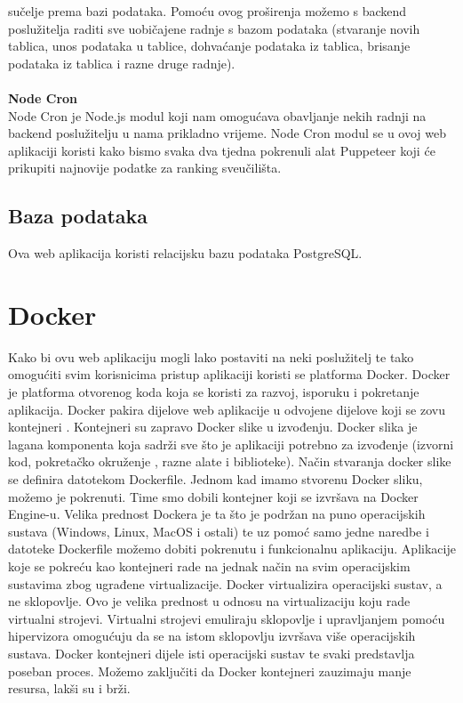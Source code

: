 \documentclass[times, utf8, zavrsni]{fer}
\begin{document}
sučelje prema bazi podataka. Pomoću ovog proširenja možemo s backend poslužitelja raditi sve uobičajene radnje s bazom podataka (stvaranje novih tablica, 
unos podataka u tablice, dohvaćanje podataka iz tablica, brisanje podataka iz tablica i razne druge radnje).
\\ \\ \textbf{Node Cron}
\\ Node Cron je Node.js modul koji nam omogućava obavljanje nekih radnji na backend poslužitelju u nama prikladno vrijeme. Node Cron modul se u ovoj 
web aplikaciji koristi kako bismo svaka dva tjedna pokrenuli alat Puppeteer koji će prikupiti najnovije podatke za ranking sveučilišta.
\\ \subsection{Baza podataka}Ova web aplikacija koristi relacijsku bazu podataka PostgreSQL. 
\\ \section{Docker}
Kako bi ovu web aplikaciju mogli lako postaviti  na neki poslužitelj te tako omogućiti svim korisnicima pristup aplikaciji 
koristi se platforma Docker. Docker je platforma otvorenog koda koja se koristi za razvoj, isporuku i pokretanje aplikacija.
Docker pakira dijelove web aplikacije u odvojene dijelove koji se zovu kontejneri .
Kontejneri su zapravo Docker slike  u izvođenju. Docker slika je lagana  komponenta koja sadrži sve što je aplikaciji 
potrebno za izvođenje (izvorni kod, pokretačko okruženje , razne alate i biblioteke). Način stvaranja docker slike se definira 
datotekom Dockerfile. Jednom kad imamo stvorenu Docker sliku, možemo je pokrenuti. Time smo dobili kontejner koji se izvršava na Docker Engine-u. 
Velika prednost Dockera je ta što je podržan na puno operacijskih sustava (Windows, Linux, MacOS i ostali) te uz pomoć samo jedne naredbe i datoteke Dockerfile
možemo dobiti pokrenutu i funkcionalnu aplikaciju. Aplikacije koje se pokreću kao kontejneri rade na jednak način na svim operacijskim sustavima zbog ugrađene virtualizacije.
Docker virtualizira operacijski sustav, a ne sklopovlje. Ovo je velika prednost u odnosu na virtualizaciju koju rade virtualni strojevi. 
Virtualni strojevi emuliraju sklopovlje i upravljanjem pomoću hipervizora omogućuju da se na istom sklopovlju izvršava više operacijskih sustava. 
Docker kontejneri dijele isti operacijski sustav te svaki predstavlja poseban proces. Možemo zaključiti da Docker kontejneri zauzimaju manje 
resursa, lakši su i brži. 
\end{document}
